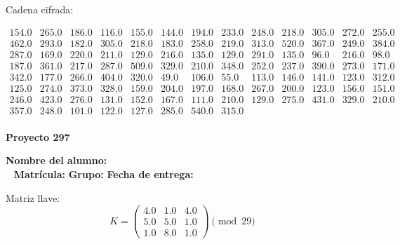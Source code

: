 \documentclass[12pt]{article}
\begin{document}
Cadena cifrada:
\begin{center}
$\begin{array}{lllllllllllll}
154.0 & 265.0 & 186.0 & 116.0 & 155.0 & 144.0 & 194.0 & 233.0 & 248.0 & 218.0 & 305.0 & 272.0 & 255.0\\
462.0 & 293.0 & 182.0 & 305.0 & 218.0 & 183.0 & 258.0 & 219.0 & 313.0 & 520.0 & 367.0 & 249.0 & 384.0\\
287.0 & 169.0 & 220.0 & 211.0 & 129.0 & 216.0 & 135.0 & 129.0 & 291.0 & 135.0 & 96.0 & 216.0 & 98.0\\
187.0 & 361.0 & 217.0 & 287.0 & 509.0 & 329.0 & 210.0 & 348.0 & 252.0 & 237.0 & 390.0 & 273.0 & 171.0\\
342.0 & 177.0 & 266.0 & 404.0 & 320.0 & 49.0 & 106.0 & 55.0 & 113.0 & 146.0 & 141.0 & 123.0 & 312.0\\
125.0 & 274.0 & 373.0 & 328.0 & 159.0 & 204.0 & 197.0 & 168.0 & 267.0 & 200.0 & 123.0 & 156.0 & 151.0\\
246.0 & 423.0 & 276.0 & 131.0 & 152.0 & 167.0 & 111.0 & 210.0 & 129.0 & 275.0 & 431.0 & 329.0 & 210.0\\
357.0 & 248.0 & 101.0 & 122.0 & 127.0 & 285.0 & 540.0 & 315.0\\
\end{array}$
\end{center}

\newpage


\textbf{Proyecto 297}

\textbf{Nombre del alumno:} \underline{\hspace{13cm}}\\\
\vspace{1cm}
\textbf{Matrícula:} \underline{\hspace{4cm}} \hspace{1cm}
\textbf{Grupo:} \underline{\hspace{2cm}}
\textbf{Fecha de entrega:} \underline{\hspace{2cm}}

\medskip

Matriz llave:
\[
K = \begin{pmatrix}
4.0 & 1.0 & 4.0\\
5.0 & 5.0 & 1.0\\
1.0 & 8.0 & 1.0
\end{pmatrix} \pmod{29}
\]
\end{document}
